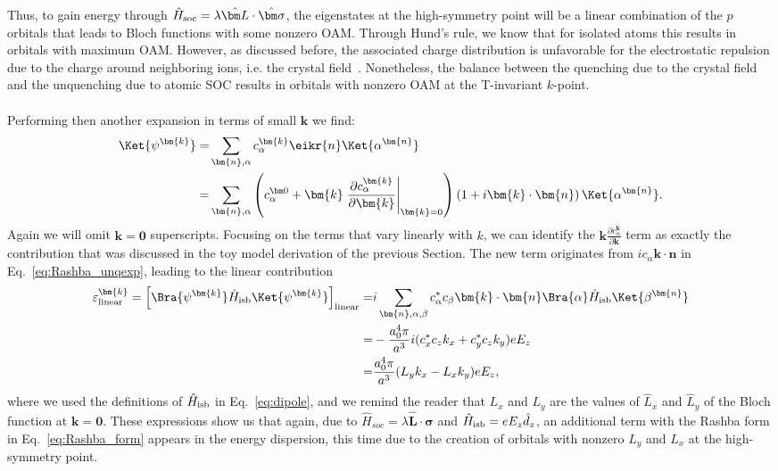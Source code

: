 Thus, to gain energy through $\hat H_{\rm soc} = \lambda \hat {\bm L}\cdot \hat{\bm \sigma}$, the eigenstates at the high-symmetry point will be a linear combination of the $p$ orbitals that leads to Bloch functions with some nonzero OAM.
Through Hund's rule, we know that for isolated atoms this results in orbitals with maximum OAM.
However, as discussed before, the associated charge distribution is unfavorable for the electrostatic repulsion due to the charge around neighboring ions, i.e. the crystal field~\cite{Ballhausen}.
Nonetheless, the balance between the quenching due to the crystal field and the unquenching due to atomic SOC results in orbitals with nonzero OAM at the T-invariant $k$-point. 
\\\\
Performing then another expansion in terms of small $\bm k$ we find:
\begin{align}
	\Ket{\psi^{\bm{k}}} =& \sum_{\bm{n},\alpha} c_\alpha^{\bm{k}} \eikr{n} \Ket{\alpha^{\bm{n}}}\\
	=& \sum_{\bm{n},\alpha} \left(c_\alpha^{\bm 0} + \bm{k}\left.\frac{\partial c_\alpha^{\bm{k}}}{\partial \bm{k}}\right\rvert_{\bm{k}=0} \right)\left(1 + i\bm{k}\cdot\bm{n}\right)\Ket{\alpha^{\bm{n}}}\label{eq:Rashba_unqexp}.
\end{align}
Again we will omit $\bm{k}=\bm 0$ superscripts.
Focusing on the terms that vary linearly with $k$, we can identify the $\bm k \frac{\partial c_\alpha^{\bm k}}{\partial \bm k}$ term as exactly the contribution that was discussed in the toy model derivation of the previous Section.
The new term originates from $ic_\alpha \bm k \cdot \bm n$ in Eq.~\eqref{eq:Rashba_unqexp}, leading to the linear contribution
\begin{align}
	\label{eq:d_z_from_OAM}
	\varepsilon^{\bm{k}}_{\rm linear} = \left[\Bra{\psi^{\bm{k}}} \hat{H}_{\rm isb} \Ket{\psi^{\bm{k}}}\right]_{\rm linear} =&  i\sum_{\bm{n},\alpha,\beta} c_\alpha^* c_\beta \bm{k}\cdot\bm{n}\Bra{\alpha} \hat{H}_{\rm isb} \Ket{\beta^{\bm{n}}}\\
	=&-\frac{a_0^4 \pi}{a^3}i(c^*_xc_zk_x + c^*_yc_z k_y) e E_z  \\
	=&\frac{a_0^4 \pi}{a^3}(L_y k_x - L_x k_y) e E_z,
\end{align}
where we used the definitions of $\hat{H}_{\rm isb}$ in Eq.~\eqref{eq:dipole}, and we remind the reader that $L_x$ and $L_y$ are the values of $\hat{L}_x$ and $\hat{L}_y$ of the Bloch function at $\bm k = \bm 0$.
These expressions show us that again, due to ${\hat{H}_{soc} = \lambda \hat{\bm{L}}\cdot\hat{\bm{\sigma}}}$ and $\hat{H}_{\rm isb} = e E_z \hat{d}_z$, an additional term with the Rashba form in Eq.~\eqref{eq:Rashba_form} appears in the energy dispersion, this time due to the creation of orbitals with nonzero $L_y$ and $L_x$ at the high-symmetry point.
